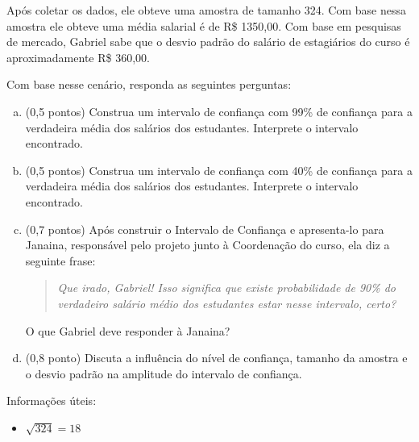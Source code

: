 \documentclass[12pt]{article}
\begin{document}
Após coletar os dados, ele obteve uma amostra de tamanho 324. Com base nessa amostra ele obteve uma média salarial é de R\$ 1350,00. Com base em pesquisas de mercado, 
Gabriel sabe que o desvio padrão do salário de estagiários do curso é aproximadamente R\$ 360,00. 

Com base nesse cenário, responda as seguintes perguntas:

\begin{enumerate}[a)]
    \item (0,5 pontos) Construa um intervalo de confiança com 99\% de confiança para a verdadeira média dos salários dos estudantes. Interprete o intervalo encontrado. 
    \item (0,5 pontos) Construa um intervalo de confiança com 40\% de confiança para a verdadeira média dos salários dos estudantes. Interprete o intervalo encontrado.
    \item (0,7 pontos) Após construir o Intervalo de Confiança e apresenta-lo para Janaina, responsável pelo projeto junto à Coordenação do curso, ela diz a seguinte frase:
    \begin{quote}
    \textit{Que irado, Gabriel! Isso significa que existe probabilidade de 90\% do verdadeiro salário médio dos estudantes estar nesse intervalo, certo? }
    \end{quote}

    O que Gabriel deve responder à Janaina?

    \item (0,8 ponto) Discuta a influência do nível de confiança, tamanho da amostra e o desvio padrão na amplitude do intervalo de confiança.
\end{enumerate}


Informações úteis:

\begin{itemize}
    \item $\sqrt{324} = 18$
\end{itemize}
\end{document}
